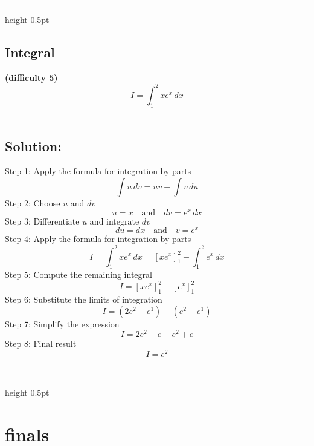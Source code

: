 \documentclass{article}
\renewcommand{\rule}[2]{\leavevmode\leaders\hrule height #2 \hfill \kern 0pt}
\begin{document}
\begin{itemize}
  \begin{center}\rule{0.5\linewidth}{0.5pt}\end{center}

  \subsection{Integral}\label{integral-5}

  \textbf{(difficulty 5)}\\
  \[
  I = \int_1^2 x e^x \, dx
  \]\\

  \subsection{Solution:}\label{solution-5}

  \hfill\break
  Step 1: Apply the formula for integration by parts \[
  \int u \, dv = uv - \int v \, du
  \] Step 2: Choose \(u\) and \(dv\) \[
  u = x \quad \text{and} \quad dv = e^x \, dx
  \] Step 3: Differentiate \(u\) and integrate \(dv\) \[
  du = dx \quad \text{and} \quad v = e^x
  \] Step 4: Apply the formula for integration by parts \[
  I = \int_1^2 x e^x \, dx = \left[ x e^x \right]_1^2 - \int_1^2 e^x \, dx
  \] Step 5: Compute the remaining integral \[
  I = \left[ x e^x \right]_1^2 - \left[ e^x \right]_1^2
  \] Step 6: Substitute the limits of integration \[
  I = \left( 2e^2 - e^1 \right) - \left( e^2 - e^1 \right)
  \] Step 7: Simplify the expression \[
  I = 2e^2 - e - e^2 + e
  \] Step 8: Final result \[
  I = e^2
  \]\\

  \begin{center}\rule{0.5\linewidth}{0.5pt}\end{center}
\end{itemize}

\section{finals}\label{finals}
\end{document}
